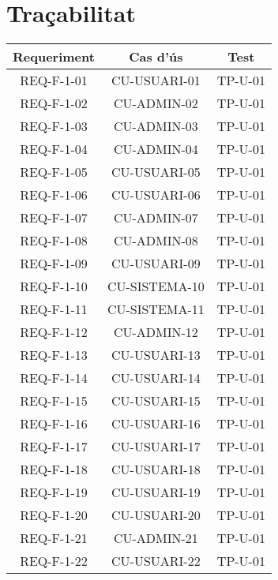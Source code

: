 \section{Traçabilitat}\label{sec:intro}

\begin{center}
\begin{tabular}{|c|c|c|}
\hline
{\cellcolor[gray]{.8} \bf Requeriment} & {\cellcolor[gray]{.8} \bf Cas d'ús} & {\cellcolor[gray]{.8} \bf Test}  \\
\hline
REQ-F-1-01 & CU-USUARI-01 & TP-U-01 \\
\hline
REQ-F-1-02 & CU-ADMIN-02 & TP-U-01 \\
\hline
REQ-F-1-03 & CU-ADMIN-03 & TP-U-01 \\
\hline
REQ-F-1-04 & CU-ADMIN-04 & TP-U-01 \\
\hline
REQ-F-1-05 & CU-USUARI-05 & TP-U-01 \\
\hline
REQ-F-1-06 & CU-USUARI-06 & TP-U-01 \\
\hline
REQ-F-1-07 & CU-ADMIN-07 & TP-U-01 \\
\hline
REQ-F-1-08 & CU-ADMIN-08 & TP-U-01 \\
\hline
REQ-F-1-09 & CU-USUARI-09 & TP-U-01 \\
\hline
REQ-F-1-10 & CU-SISTEMA-10 & TP-U-01 \\
\hline
REQ-F-1-11 & CU-SISTEMA-11 & TP-U-01 \\
\hline
REQ-F-1-12 & CU-ADMIN-12 & TP-U-01 \\
\hline
REQ-F-1-13 & CU-USUARI-13 & TP-U-01 \\
\hline
REQ-F-1-14 & CU-USUARI-14 & TP-U-01 \\
\hline
REQ-F-1-15 & CU-USUARI-15 & TP-U-01 \\
\hline
REQ-F-1-16 & CU-USUARI-16 & TP-U-01 \\
\hline
REQ-F-1-17 & CU-USUARI-17 & TP-U-01 \\
\hline
REQ-F-1-18 & CU-USUARI-18 & TP-U-01 \\
\hline
REQ-F-1-19 & CU-USUARI-19 & TP-U-01 \\
\hline
REQ-F-1-20 & CU-USUARI-20 & TP-U-01 \\
\hline
REQ-F-1-21 & CU-ADMIN-21 & TP-U-01 \\
\hline
REQ-F-1-22 & CU-USUARI-22 & TP-U-01 \\
\hline

\end{tabular}
\end{center}

